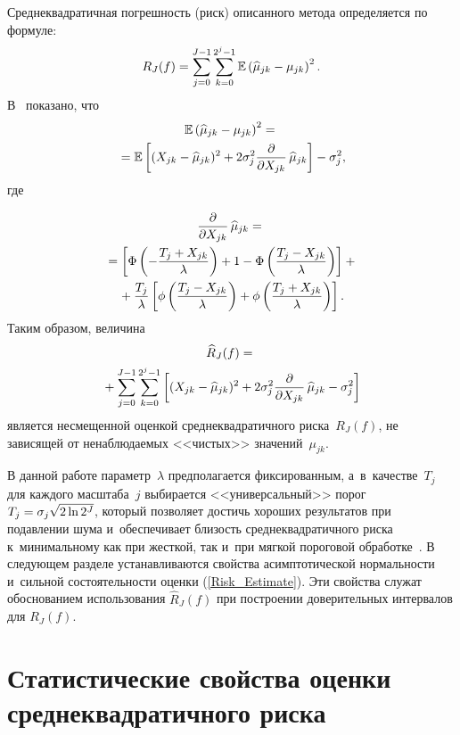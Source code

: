 \begin{multicols}{2}
Среднеквадратичная по\-греш\-ность (риск) описанного метода определяется по формуле:
\begin{equation*}
\label{Risk}
R_J(f)=\sum\limits_{j=0}^{J-1}\sum\limits_{k=0}^{2^j-1}\mathbb{E}
\left(\widehat{\mu}_{jk}-\mu_{jk}\right)^2.
\end{equation*}
В~\cite{HL10} показано, что
\begin{multline*}
\mathbb{E}\left(\widehat{\mu}_{jk}-\mu_{jk}\right)^2={}\\
{}=
\mathbb{E}\left[(X_{jk}-\widehat{\mu}_{jk})^2+2\sigma_j^2
\displaystyle\frac{\displaystyle \partial\mathstrut}{\displaystyle \partial X_{jk}\mathstrut}\,\widehat{\mu}_{jk}\right]-\sigma_j^2,
\end{multline*}
где

\noindent
\begin{multline*}
\displaystyle\frac{\displaystyle \partial\mathstrut}{\displaystyle \partial X_{jk}\mathstrut}\,\widehat{\mu}_{jk}={}\\
{}=
\left[\Phi\left(-\displaystyle\frac{\displaystyle T_j+X_{jk}\mathstrut}{\displaystyle \lambda\mathstrut}\right)+1-
\Phi\left(\displaystyle\frac{\displaystyle T_j-X_{jk}\mathstrut}{\displaystyle \lambda\mathstrut}\right)\right]+{}\\
{}+
\displaystyle\frac{\displaystyle T_j\mathstrut}{\displaystyle \lambda\mathstrut}\left[\phi\left(\displaystyle\frac{\displaystyle T_j-X_{jk}\mathstrut}{\displaystyle \lambda\mathstrut}\right)+
\phi\left(\displaystyle\frac{\displaystyle T_j+X_{jk}\mathstrut}{\displaystyle \lambda\mathstrut}\right)\right].
\end{multline*}
Таким образом, величина
\begin{multline}
\label{Risk_Estimate}
\widehat{R}_J(f)={}\\
{}+\sum\limits_{j=0}^{J-1}\sum\limits_{k=0}^{2^j-1}
\left[(X_{jk}-\widehat{\mu}_{jk})^2+2\sigma_j^2
\displaystyle\frac{\displaystyle \partial\mathstrut}{\displaystyle \partial X_{jk}\mathstrut}\,\widehat{\mu}_{jk}-\sigma_j^2\right]
\end{multline}
является несмещенной оценкой среднеквадратичного риска~$R_J(f)$, не зависящей от 
ненаблюдаемых <<чистых>> значений~$\mu_{jk}$.

В данной работе параметр~$\lambda$ предполагается фиксированным, а~в~качестве~$T_j$ 
для каждого мас\-шта\-ба~$j$ выбирается <<универсальный>> порог $T_j\hm=
\sigma_j\sqrt{2\ln 2^J}$, который поз\-во\-ля\-ет достичь хороших 
результатов при подавлении шума и~обеспечивает бли\-зость сред\-не\-квад\-ра\-тич\-но\-го 
рис\-ка к~минимальному как при жесткой, так и~при мягкой пороговой обработке~\cite{DJ94}. В следующем разделе устанавливаются свойства асимптотической нормальности и~сильной состоятельности оценки (\ref{Risk_Estimate}). Эти свойства служат обоснованием использования $\widehat{R}_J(f)$ при построении доверительных интервалов для $R_J(f)$.

\vspace*{-3pt}

\section{Статистические свойства оценки среднеквадратичного риска}


\end{multicols}
